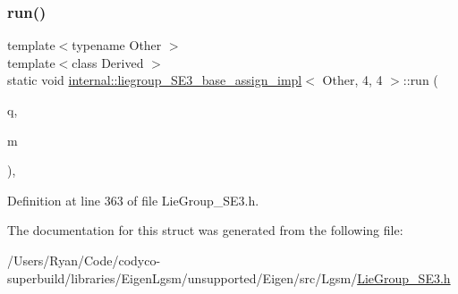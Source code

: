 \subsubsection{\texorpdfstring{run()}{run()}}
{\footnotesize\ttfamily template$<$typename Other $>$ \\
template$<$class Derived $>$ \\
static void \hyperlink{structinternal_1_1liegroup___s_e3__base__assign__impl}{internal\+::liegroup\+\_\+\+S\+E3\+\_\+base\+\_\+assign\+\_\+impl}$<$ Other, 4, 4 $>$\+::run (\begin{DoxyParamCaption}\item[{\hyperlink{class_lie_group_base}{Lie\+Group\+Base}$<$ Array$<$ typename internal\+::traits$<$ Derived $>$\+::\hyperlink{structinternal_1_1liegroup___s_e3__base__assign__impl_3_01_other_00_014_00_014_01_4_a850deb96b6b52d92a8ae1e6d771b24be}{Scalar}, 7, 1 $>$, Derived $>$ \&}]{q,  }\item[{const Other \&}]{m }\end{DoxyParamCaption})\hspace{0.3cm}{\ttfamily [inline]}, {\ttfamily [static]}}



Definition at line 363 of file Lie\+Group\+\_\+\+S\+E3.\+h.



The documentation for this struct was generated from the following file\+:\begin{DoxyCompactItemize}
\item 
/\+Users/\+Ryan/\+Code/codyco-\/superbuild/libraries/\+Eigen\+Lgsm/unsupported/\+Eigen/src/\+Lgsm/\hyperlink{_lie_group___s_e3_8h}{Lie\+Group\+\_\+\+S\+E3.\+h}\end{DoxyCompactItemize}
